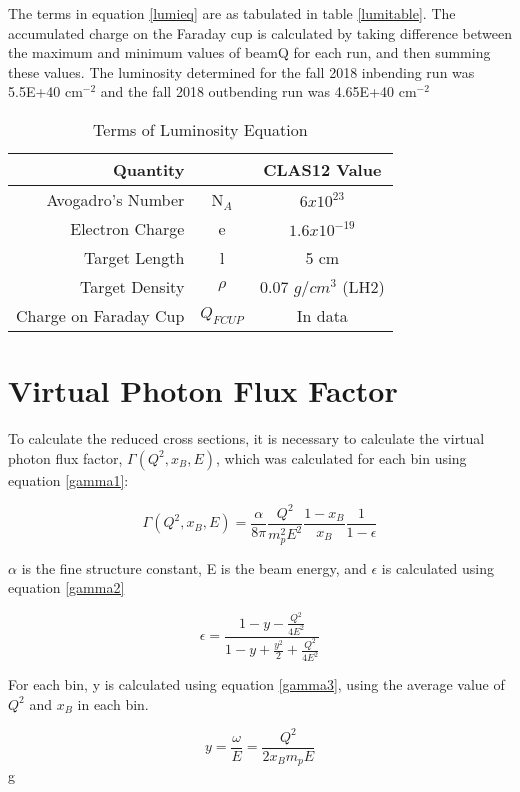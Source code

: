 The terms in equation \ref{lumieq} are as tabulated in table \ref{lumitable}. The accumulated charge on the Faraday cup is calculated by taking difference between the maximum and minimum values of beamQ for each run, and then summing these values. The luminosity determined for the fall 2018 inbending run was 5.5E+40 cm$^{-2}$ and the fall 2018 outbending run was 4.65E+40 cm$^{-2}$

\begin{table}[h]
    \centering
    \begin{tabular}{rcc}
        Quantity &  & CLAS12 Value \\\hline
       Avogadro's Number &  N$_A$  & $6x10^{23}$ \\
        Electron Charge &e  &  $1.6x10^{-19}$ \\
        Target Length &l &  5 cm \\
        Target Density &$\rho$  &  0.07 $g/cm^3$ (LH2) \\
        Charge on Faraday Cup & $Q_{FCUP}$ &  In data\\
    \end{tabular}
\caption{Terms of Luminosity Equation}
\end{table}\label{lumitable}

\section{Virtual Photon Flux Factor}
To calculate the reduced cross sections, it is necessary to calculate the virtual photon flux factor, $\Gamma (Q^2, x_B, E)$, which was calculated for each bin using equation \ref{gamma1}:

 \begin{equation}\label{gamma1}
            \Gamma (Q^2, x_B, E) = \frac{\alpha}{8\pi} \frac{Q^2}{m^2_pE^2}\frac{1-x_B}{x_B}\frac{1}{1-\epsilon}
\end{equation}

$\alpha$ is the fine structure constant, E is the beam energy, and $\epsilon$ is calculated using equation \ref{gamma2}

 \begin{equation}\label{gamma2}
            \epsilon = \frac{1-y-\frac{Q^2}{4E^2}}{1-y+\frac{y^2}{2}+\frac{Q^2}{4E^2}}
\end{equation}

For each bin, y is calculated using equation \ref{gamma3}, using the average value of $Q^2$ and $x_B$ in each bin.

 \begin{equation}\label{gamma3}
           y = \frac{\omega}{E} = \frac{Q^2}{2x_Bm_pE}
\end{equation}g